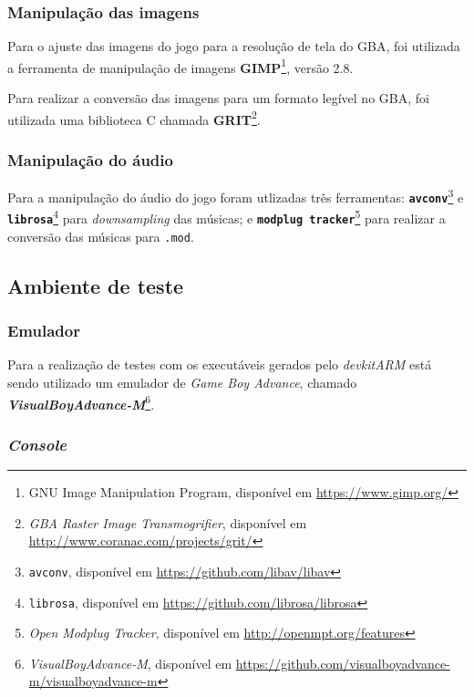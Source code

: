     \subsubsection{Manipulação das imagens}

      Para o ajuste das imagens do jogo para a resolução de tela do GBA, foi utilizada a ferramenta de manipulação de imagens \textbf{GIMP}\footnote{GNU Image Manipulation Program, disponível em \url{https://www.gimp.org/}}, versão 2.8.

      Para realizar a conversão das imagens para um formato legível no GBA, foi utilizada uma biblioteca C chamada \textbf{GRIT}\footnote{\textit{GBA Raster Image Transmogrifier}, disponível em \url{http://www.coranac.com/projects/grit/}}.

    \subsubsection{Manipulação do áudio}
      Para a manipulação do áudio do jogo foram utlizadas três ferramentas: \texttt{\textbf{avconv}}\footnote{\texttt{avconv}, disponível em \url{https://github.com/libav/libav}} e \texttt{\textbf{librosa}}\footnote{\texttt{librosa}, disponível em \url{https://github.com/librosa/librosa}} para \textit{downsampling} das músicas; e \texttt{\textbf{modplug tracker}}\footnote{\textit{Open Modplug Tracker}, disponível em \url{http://openmpt.org/features}} para realizar a conversão das músicas para \texttt{.mod}.


  \subsection{Ambiente de teste}

    \subsubsection{Emulador}

      Para a realização de testes com os executáveis gerados pelo \textit{devkitARM} está sendo utilizado um emulador de \textit{Game Boy Advance}, chamado \textbf{\textit{VisualBoyAdvance-M}}\footnote{\textit{VisualBoyAdvance-M}, disponível em \url{https://github.com/visualboyadvance-m/visualboyadvance-m}}.

    \subsubsection{\textit{Console}} \label{console}


